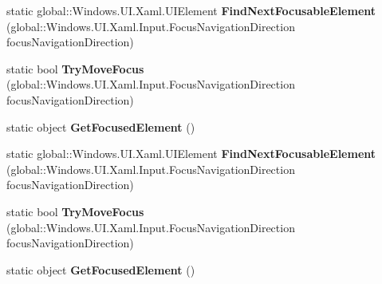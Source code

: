 \begin{DoxyCompactItemize}
\item 
\mbox{\label{class_windows_1_1_u_i_1_1_xaml_1_1_input_1_1_focus_manager_a4e3a3d58723cc4a3d351f28c100dd644}} 
static global\+::\+Windows.\+U\+I.\+Xaml.\+U\+I\+Element {\bfseries Find\+Next\+Focusable\+Element} (global\+::\+Windows.\+U\+I.\+Xaml.\+Input.\+Focus\+Navigation\+Direction focus\+Navigation\+Direction)
\item 
\mbox{\label{class_windows_1_1_u_i_1_1_xaml_1_1_input_1_1_focus_manager_ab563de83db92e54ea87ab66f08208a6c}} 
static bool {\bfseries Try\+Move\+Focus} (global\+::\+Windows.\+U\+I.\+Xaml.\+Input.\+Focus\+Navigation\+Direction focus\+Navigation\+Direction)
\item 
\mbox{\label{class_windows_1_1_u_i_1_1_xaml_1_1_input_1_1_focus_manager_a5fac98429232cfe24747a7f58343840d}} 
static object {\bfseries Get\+Focused\+Element} ()
\item 
\mbox{\label{class_windows_1_1_u_i_1_1_xaml_1_1_input_1_1_focus_manager_a4e3a3d58723cc4a3d351f28c100dd644}} 
static global\+::\+Windows.\+U\+I.\+Xaml.\+U\+I\+Element {\bfseries Find\+Next\+Focusable\+Element} (global\+::\+Windows.\+U\+I.\+Xaml.\+Input.\+Focus\+Navigation\+Direction focus\+Navigation\+Direction)
\item 
\mbox{\label{class_windows_1_1_u_i_1_1_xaml_1_1_input_1_1_focus_manager_ab563de83db92e54ea87ab66f08208a6c}} 
static bool {\bfseries Try\+Move\+Focus} (global\+::\+Windows.\+U\+I.\+Xaml.\+Input.\+Focus\+Navigation\+Direction focus\+Navigation\+Direction)
\item 
\mbox{\label{class_windows_1_1_u_i_1_1_xaml_1_1_input_1_1_focus_manager_a5fac98429232cfe24747a7f58343840d}} 
static object {\bfseries Get\+Focused\+Element} ()
\item 
\mbox{\label{class_windows_1_1_u_i_1_1_xaml_1_1_input_1_1_focus_manager_a4e3a3d58723cc4a3d351f28c100dd644}} 

\end{DoxyCompactItemize}
